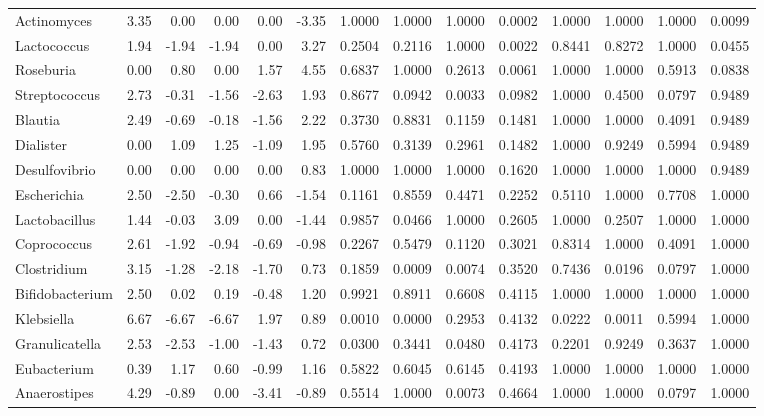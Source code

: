 {\begin{landscape}
\begin{longtable}{ | l | r | r | r | r | r | r  | r | r | r | r | r | r  | r  |}
		
		Actinomyces & 3.35 & 0.00 & 0.00 & 0.00 & -3.35 & 1.0000 & 1.0000 & 1.0000 & 0.0002 & 1.0000 & 1.0000 & 1.0000 & 0.0099 \\ 
		Lactococcus & 1.94 & -1.94 & -1.94 & 0.00 & 3.27 & 0.2504 & 0.2116 & 1.0000 & 0.0022 & 0.8441 & 0.8272 & 1.0000 & 0.0455 \\ 
		Roseburia & 0.00 & 0.80 & 0.00 & 1.57 & 4.55 & 0.6837 & 1.0000 & 0.2613 & 0.0061 & 1.0000 & 1.0000 & 0.5913 & 0.0838 \\ 
		Streptococcus & 2.73 & -0.31 & -1.56 & -2.63 & 1.93 & 0.8677 & 0.0942 & 0.0033 & 0.0982 & 1.0000 & 0.4500 & 0.0797 & 0.9489 \\ 
		Blautia & 2.49 & -0.69 & -0.18 & -1.56 & 2.22 & 0.3730 & 0.8831 & 0.1159 & 0.1481 & 1.0000 & 1.0000 & 0.4091 & 0.9489 \\ 
		Dialister & 0.00 & 1.09 & 1.25 & -1.09 & 1.95 & 0.5760 & 0.3139 & 0.2961 & 0.1482 & 1.0000 & 0.9249 & 0.5994 & 0.9489 \\ 
		Desulfovibrio & 0.00 & 0.00 & 0.00 & 0.00 & 0.83 & 1.0000 & 1.0000 & 1.0000 & 0.1620 & 1.0000 & 1.0000 & 1.0000 & 0.9489 \\ 
		Escherichia & 2.50 & -2.50 & -0.30 & 0.66 & -1.54 & 0.1161 & 0.8559 & 0.4471 & 0.2252 & 0.5110 & 1.0000 & 0.7708 & 1.0000 \\ 
		Lactobacillus & 1.44 & -0.03 & 3.09 & 0.00 & -1.44 & 0.9857 & 0.0466 & 1.0000 & 0.2605 & 1.0000 & 0.2507 & 1.0000 & 1.0000 \\ 
		Coprococcus & 2.61 & -1.92 & -0.94 & -0.69 & -0.98 & 0.2267 & 0.5479 & 0.1120 & 0.3021 & 0.8314 & 1.0000 & 0.4091 & 1.0000 \\ 
		Clostridium & 3.15 & -1.28 & -2.18 & -1.70 & 0.73 & 0.1859 & 0.0009 & 0.0074 & 0.3520 & 0.7436 & 0.0196 & 0.0797 & 1.0000 \\ 
		Bifidobacterium & 2.50 & 0.02 & 0.19 & -0.48 & 1.20 & 0.9921 & 0.8911 & 0.6608 & 0.4115 & 1.0000 & 1.0000 & 1.0000 & 1.0000 \\ 
		Klebsiella & 6.67 & -6.67 & -6.67 & 1.97 & 0.89 & 0.0010 & 0.0000 & 0.2953 & 0.4132 & 0.0222 & 0.0011 & 0.5994 & 1.0000 \\ 
		Granulicatella & 2.53 & -2.53 & -1.00 & -1.43 & 0.72 & 0.0300 & 0.3441 & 0.0480 & 0.4173 & 0.2201 & 0.9249 & 0.3637 & 1.0000 \\ 
		Eubacterium & 0.39 & 1.17 & 0.60 & -0.99 & 1.16 & 0.5822 & 0.6045 & 0.6145 & 0.4193 & 1.0000 & 1.0000 & 1.0000 & 1.0000 \\ 
		Anaerostipes & 4.29 & -0.89 & 0.00 & -3.41 & -0.89 & 0.5514 & 1.0000 & 0.0073 & 0.4664 & 1.0000 & 1.0000 & 0.0797 & 1.0000 \\ 

\end{longtable}
\end{landscape}}
